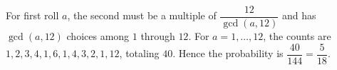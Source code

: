 For first roll $a$, the second must be a multiple of $\dfrac{12}{\gcd(a,12)}$ and has $\gcd(a,12)$ choices among $1$ through $12$. For $a=1,\ldots,12$, the counts are $1,2,3,4,1,6,1,4,3,2,1,12$, totaling $40$. Hence the probability is $\boxed{\dfrac{40}{144}=\dfrac{5}{18}}$.
